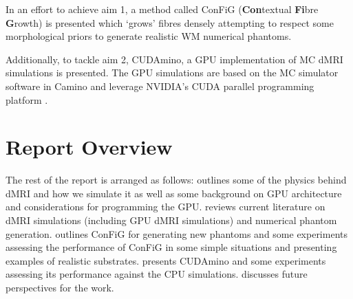 In an effort to achieve aim 1, a method called \acs{ConFiG} (\textbf{Con}textual \textbf{Fi}bre \textbf{G}rowth) is presented which `grows' fibres densely attempting to respect some morphological priors to generate realistic \ac{WM} numerical phantoms.


Additionally, to tackle aim 2, CUDAmino, a \ac{GPU} implementation of \ac{MC} \ac{dMRI} simulations is presented. The \ac{GPU} simulations are based on the \ac{MC} simulator software in Camino \cite{Cook2006,Hall2009} and leverage NVIDIA's \acs{CUDA} parallel programming platform \cite{Nickolls2008}.




\section{Report Overview}
\label{sec:intro_report_overview}
The rest of the report is arranged as follows:  outlines some of the physics behind \acl{dMRI} and how we simulate it as well as some background on \ac{GPU} architecture and considerations for programming the \ac{GPU}.  reviews current literature on \ac{dMRI} simulations (including \ac{GPU} \ac{dMRI} simulations) and numerical phantom generation.  outlines \ac{ConFiG} for generating new phantoms and some experiments assessing the performance of \ac{ConFiG} in some simple situations and presenting examples of realistic substrates.  presents CUDAmino and some experiments assessing its performance against the \ac{CPU} simulations.  discusses future perspectives for the work.



